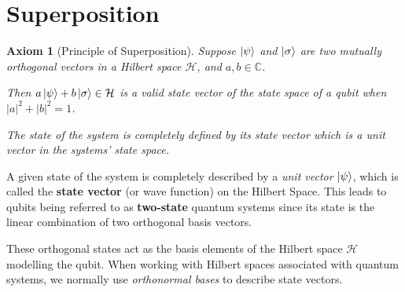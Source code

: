 \documentclass[12pt,twoside,fleqn]{report}
\theoremstyle{thmstyle}
\newtheorem{axiom}{Axiom}[chapter]
\begin{document}
\section{Superposition}
\begin{mdframed}
\begin{axiom}[Principle of Superposition]

    Suppose $\ket{\psi}$ and $\ket{\sigma}$ are two mutually orthogonal vectors in a Hilbert space $\mathcal{H}$, and $a, b \in \mathbb{C}$. 

    Then $a \ket{\psi} + b \ket{\sigma} \in \mathcal{H}$ is a valid state vector of the state space of a qubit when $|a|^2 + |b|^2 = 1$. 

    The state of the system is completely defined by its state vector which is a unit vector in the systems' state space.
\end{axiom}
\end{mdframed}

A given state of the system is completely described by a \textit{unit vector} $\ket{\psi}$, which is called the \textbf{state vector} (or wave function) on the Hilbert Space. This leads to qubits being referred to as \textbf{two-state} quantum systems since its state is the linear combination of two orthogonal basis vectors. 

These orthogonal states act as the basis elements of the Hilbert space $\mathcal{H}$ modelling the qubit. When working with Hilbert spaces associated with quantum systems, we normally use \textit{orthonormal bases} to describe state vectors.
\end{document}
